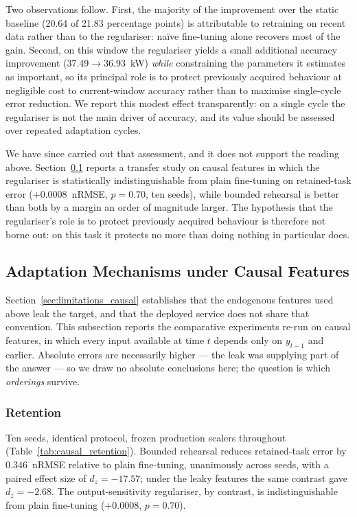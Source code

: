 \documentclass[journal]{IEEEtran}
\begin{document}
Two observations follow. First, the majority of the improvement over the
static baseline (20.64 of 21.83 percentage points) is attributable to
retraining on recent data rather than to the regulariser: na\"ive
fine-tuning alone recovers most of the gain. Second, on this window the
regulariser yields a small additional accuracy improvement
(37.49$\rightarrow$36.93~kW) \emph{while} constraining the parameters it
estimates as important, so its principal role is to protect previously
acquired behaviour at negligible cost to current-window accuracy rather
than to maximise single-cycle error reduction. We report this modest
effect transparently: on a single cycle the regulariser is not the main
driver of accuracy, and its value should be assessed over repeated
adaptation cycles.

We have since carried out that assessment, and it does not support the
reading above. Section~\ref{sec:results_causal} reports a transfer study
on causal features in which the regulariser is statistically
indistinguishable from plain fine-tuning on retained-task error
($+0.0008$~nRMSE, $p=0.70$, ten seeds), while bounded rehearsal is better
than both by a margin an order of magnitude larger. The hypothesis that
the regulariser's role is to protect previously acquired behaviour is
therefore not borne out: on this task it protects no more than doing
nothing in particular does.

\subsection{Adaptation Mechanisms under Causal Features}
\label{sec:results_causal}

Section~\ref{sec:limitations_causal} establishes that the endogenous
features used above leak the target, and that the deployed service does
not share that convention. This subsection reports the comparative
experiments re-run on causal features, in which every input available at
time $t$ depends only on $y_{t-1}$ and earlier. Absolute errors are
necessarily higher --- the leak was supplying part of the answer --- so we
draw no absolute conclusions here; the question is which \emph{orderings}
survive.

\subsubsection{Retention}
Ten seeds, identical protocol, frozen production scalers throughout
(Table~\ref{tab:causal_retention}). Bounded rehearsal reduces retained-task
error by $0.346$~nRMSE relative to plain fine-tuning, unanimously across
seeds, with a paired effect size of $d_z = -17.57$; under the leaky
features the same contrast gave $d_z=-2.68$. The output-sensitivity
regulariser, by contrast, is indistinguishable from plain fine-tuning
($+0.0008$, $p=0.70$).
\end{document}
